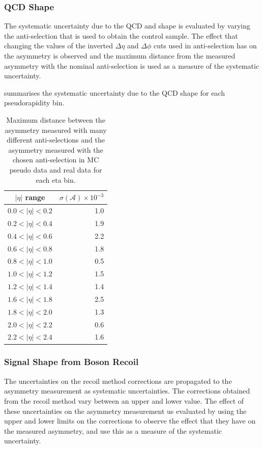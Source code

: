 \subsubsection{QCD \ETm Shape}
The systematic uncertainty due to the {QCD} and \gjet \ETm shape is evaluated
by varying the anti-selection that is used to obtain the control sample. The
effect that changing the values of the inverted $\Delta\eta$ and $\Delta\phi$
cuts used in anti-selection has on the asymmetry is observed and the maximum
distance from the measured asymmetry with the nominal anti-selection is used as a
measure of the systematic uncertainty.

 summarises the systematic uncertainty due to the
{QCD} \ETm shape for each pseudorapidity bin.

\begin{table}[htbp]
\begin{center}
\begin{tabular}{cr}
\toprule
$|\eta|$ range  & $\sigma(\mathcal{A}) \times 10^{-3}$\\
\midrule
$0.0<|\eta|<0.2$ & 1.0\\
$0.2<|\eta|<0.4$ & 1.9\\
$0.4<|\eta|<0.6$ & 2.2\\
$0.6<|\eta|<0.8$ & 1.8\\
$0.8<|\eta|<1.0$ & 0.5\\
$1.0<|\eta|<1.2$ & 1.5\\
$1.2<|\eta|<1.4$ & 1.4\\
$1.6<|\eta|<1.8$ & 2.5\\
$1.8<|\eta|<2.0$ & 1.3\\
$2.0<|\eta|<2.2$ & 0.6\\
$2.2<|\eta|<2.4$ & 1.6\\
\bottomrule
\end{tabular}
\caption{Maximum distance between the asymmetry measured with many different anti-selections
and the asymmetry measured with the chosen anti-selection in MC pseudo data and real data for each eta bin\cite{bendavid2011electron}.}
\label{tab:updatedsystQCD}
\end{center}
\end{table}

\subsubsection{Signal \ETm Shape from Boson Recoil}

The uncertainties on the recoil method corrections are propagated to the
asymmetry measurement as systematic uncertainties.  The corrections obtained
from the recoil method vary between an upper and lower
value\cite{bauer2010modeling}. The effect of these uncertainties on the
asymmetry measurement us evaluated by using the upper and lower limits on the
corrections to observe the effect that they have on the measured asymmetry, and
use this as a measure of the systematic uncertainty.

